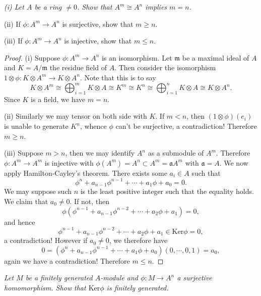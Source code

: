 \begin{problem}\em
(i) Let $A$ be a ring $\ne 0$. Show that $A^m\cong A^n$ implies $m=n$.\par
(ii) If $\phi:A^m\to A^n$ is surjective, show that $m\ge n$.\par
(iii) If $\phi:A^m\to A^n$ is injective, show that $m\le n$.
\end{problem}
\begin{proof}
(i) Suppose $\phi:A^m\to A^n$ is an isomorphism. Let $\mathfrak{m}$ be a maximal ideal of $A$ and $K=A/\mathfrak{m}$ the residue field of $A$. Then consider the isomorphism $1\otimes\phi: K\otimes A^m\to K\otimes A^n$. Note that this is to say 
$$
K\otimes A^m\cong \bigoplus_{i=1}^m{K\otimes A}\cong K^m\cong K^n\cong \bigoplus_{i=1}^n{K\otimes A}\cong K\otimes A^n.
$$
Since $K$ is a field, we have $m=n$.\par
(ii) Similarly we may tensor on both side with $K$. If $m<n$, then $(1\otimes\phi)(e_i)$ is unable to generate $K^n$, whence $\phi$ can't be surjective, a contradiction! Therefore $m\ge n$.\par
(iii) Suppose $m>n$, then we may identify $A^n$ as a submodule of $A^m$. Therefore $\phi:A^m\to A^m$ is injective with $\phi(A^m)=A^n\subset A^m=\mathfrak{a}A^m$ with $\mathfrak{a}=A$. We now apply Hamilton-Cayley's theorem. There exists some $a_i\in A$ such that 
$$
\phi ^n+a_{n-1}\phi ^{n-1}+\cdots +a_1\phi +a_0=0.
$$
We may suppose such $n$ is the least positive integer such that the equality holds. We claim that $a_0\ne 0$. If not, then 
$$
\phi \left( \phi ^{n-1}+a_{n-1}\phi ^{n-2}+\cdots +a_2\phi +a_1 \right) =0,
$$
and hence 
$$
\phi ^{n-1}+a_{n-1}\phi ^{n-2}+\cdots +a_2\phi +a_1\in \mathrm{Ker}\phi =0,
$$
a contradiction! However if $a_0\ne 0$, we therefore have 
$$
0=\left( \phi ^n+a_{n-1}\phi ^{n-1}+\cdots +a_1\phi +a_0 \right) \left( 0,\cdots ,0,1 \right) =a_0,
$$
again we have a contradiction! Therefore $m\le n$.
\end{proof}
\begin{problem}\em
Let $M$ be a finitely generated $A$-module and $\phi:M\to A^n$ a surjective homomorphism. Show that $\mathrm{Ker}\phi$ is finitely generated.
\end{problem}
